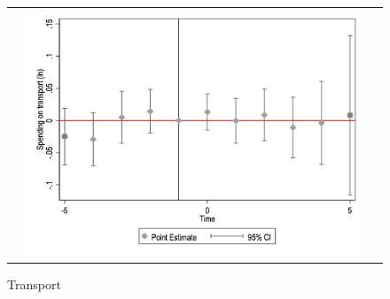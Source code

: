 \begin{figure}[!ht]
\begin{tabular}{@{}ccc@{}}
\begin{minipage}[t]{0.32\textwidth}
            \label{fig:cassport}
        \end{minipage} &
        \begin{minipage}[t]{0.32\textwidth}
            \centering
            \caption{Transport}
            \includegraphics[width=\linewidth]{images/pop_100000/caseventdd_ln_q4_08_step1.jpg}
            \label{fig:castransport}
        \end{minipage} \\[10pt]


\end{tabular}
\end{figure}

